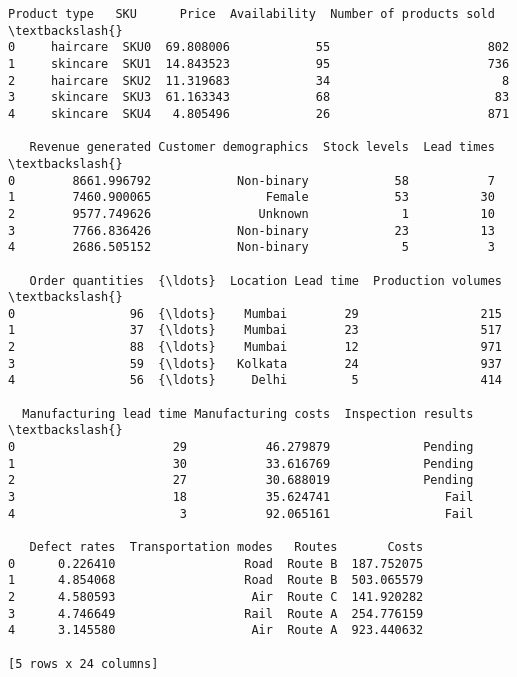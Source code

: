 \documentclass[11pt]{article}
\makeatletter
\newcommand{\boxspacing}{\kern\kvtcb@left@rule\kern\kvtcb@boxsep}
\newcommand{\prompt}[4]{
        {\ttfamily\llap{{\color{#2}[#3]:\hspace{3pt}#4}}\vspace{-\baselineskip}}
    }
\makeatother
\begin{document}
            \begin{tcolorbox}[breakable, size=fbox, boxrule=.5pt, pad at break*=1mm, opacityfill=0]
\prompt{Out}{outcolor}{3}{\boxspacing}
\begin{Verbatim}[commandchars=\\\{\}]
  Product type   SKU      Price  Availability  Number of products sold  \textbackslash{}
0     haircare  SKU0  69.808006            55                      802
1     skincare  SKU1  14.843523            95                      736
2     haircare  SKU2  11.319683            34                        8
3     skincare  SKU3  61.163343            68                       83
4     skincare  SKU4   4.805496            26                      871

   Revenue generated Customer demographics  Stock levels  Lead times  \textbackslash{}
0        8661.996792            Non-binary            58           7
1        7460.900065                Female            53          30
2        9577.749626               Unknown             1          10
3        7766.836426            Non-binary            23          13
4        2686.505152            Non-binary             5           3

   Order quantities  {\ldots}  Location Lead time  Production volumes  \textbackslash{}
0                96  {\ldots}    Mumbai        29                 215
1                37  {\ldots}    Mumbai        23                 517
2                88  {\ldots}    Mumbai        12                 971
3                59  {\ldots}   Kolkata        24                 937
4                56  {\ldots}     Delhi         5                 414

  Manufacturing lead time Manufacturing costs  Inspection results  \textbackslash{}
0                      29           46.279879             Pending
1                      30           33.616769             Pending
2                      27           30.688019             Pending
3                      18           35.624741                Fail
4                       3           92.065161                Fail

   Defect rates  Transportation modes   Routes       Costs
0      0.226410                  Road  Route B  187.752075
1      4.854068                  Road  Route B  503.065579
2      4.580593                   Air  Route C  141.920282
3      4.746649                  Rail  Route A  254.776159
4      3.145580                   Air  Route A  923.440632

[5 rows x 24 columns]
\end{Verbatim}
\end{tcolorbox}
        
\end{document}
